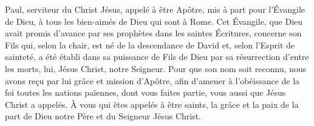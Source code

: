 Paul, serviteur du Christ Jésus,
		appelé à être Apôtre, mis à part pour l’Évangile de Dieu,
	à tous les bien-aimés de Dieu qui sont à Rome.
Cet Évangile,
	que Dieu avait promis d’avance par ses prophètes dans les saintes Écritures,
	concerne son Fils qui, selon la chair, est né de la descendance de David
	et, selon l’Esprit de sainteté,
		a été établi dans sa puissance de Fils de Dieu
		par sa résurrection d’entre les morts,
	lui, Jésus Christ, notre Seigneur.
Pour que son nom soit reconnu,
		nous avons reçu par lui grâce et mission d’Apôtre,
	afin d’amener à l’obéissance de la foi toutes les nations païennes,
	dont vous faites partie, vous aussi que Jésus Christ a appelés.
À vous qui êtes appelés à être saints,
	la grâce et la paix de la part de Dieu notre Père
		et du Seigneur Jésus Christ.
